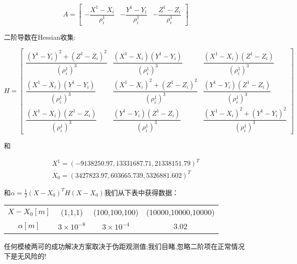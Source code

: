 		\begin{equation}\label{eq:9.30}
			A=\begin{bmatrix}
			-\dfrac{X^1-X_i}{\rho^1_i} & -\dfrac{Y^1-Y_i}{\rho^1_i} & -\dfrac{Z^1-Z_i}{\rho^1_i}
			\end{bmatrix}
		\end{equation}

	二阶导数在Hessian收集:

		\begin{equation}\label{eq:9.31}
			H=
			\begin{bmatrix}

				\dfrac{(Y^1-Y_i)^2+(Z^1-Z_i)^2}{(\rho^1_i)^3} & \dfrac{(X^1-X_i)(Y^1-Y_i)}{(\rho^1_i)^3} 		& \dfrac{(X^1-X_i)(Z^1-Z_i)}{(\rho^1_i)^3} \\

				\dfrac{(X^1-X_i)(Y^1-Y_i)}{(\rho^1_i)^3}       & \dfrac{(X^1-X_i)^2+(Z^1-Z_i)^2}{(\rho^1_i)^3}   & \dfrac{(Y^1-Y_i)(Z^1-Z_i)}{(\rho^1_i)^3} \\

				\dfrac{(X^1-X_i)(Z^1-Z_i)}{(\rho^1_i)^3} 	  & \dfrac{(Y^1-Y_i)(Z^1-Z_i)}{(\rho^1_i)^3} 		& \dfrac{(X^1-X_i)^2+(Y^1-Y_i)^2}{(\rho^1_i)^3}		
			\end{bmatrix}
		\end{equation}

	和

		\begin{align*}
			X^1=(-9138250.97,13331687.71,21338151.79)^T \\
			X_0=(3427823.97,603665.739,5326881.602)^T
		\end{align*}

	和$\alpha=\frac{1}{2}(X-X_0)^TH(X-X_0)$我们从下表中获得数据：
		\begin{table}

			\begin{tabular}{cccc}

				\hline

				$X-X_0[m]$ & (1,1,1) & (100,100,100) & (10000,10000,10000) \\ 

				$\alpha [m]$ & $3\times10^{-8}$ & $3\times10^{-4}$ & 3.02 \\ 

				\hline

			\end{tabular} 

		\end{table}

	任何模棱两可的成功解决方案取决于伪距观测值;我们目睹,忽略二阶项在正常情况下是无风险的!

			

